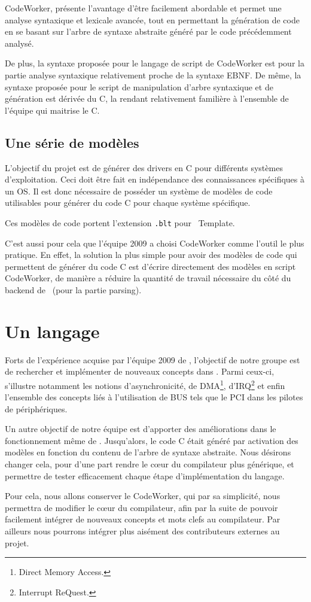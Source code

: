 \documentclass{rtxreport}
\begin{document}
CodeWorker, présente l'avantage d'être facilement abordable et permet une
analyse syntaxique et lexicale avancée, tout en permettant la génération de
code en se basant sur l'arbre de syntaxe abstraite généré par le code
précédemment analysé.

De plus, la syntaxe proposée pour le langage de script de CodeWorker est pour
la partie analyse syntaxique relativement proche de la syntaxe EBNF. De même,
la syntaxe proposée pour le script de manipulation d'arbre syntaxique et de
génération est dérivée du C, la rendant relativement familière à l'ensemble de
l'équipe qui maitrise le C.

\subsection{Une série de modèles}

L'objectif du projet est de générer des drivers en C pour différents systèmes
d'exploitation. Ceci doit être fait en indépendance des connaissances
spécifiques à un OS. Il est donc nécessaire de posséder un système de modèles
de code utilisables pour générer du code C pour chaque système spécifique.

Ces modèles de code portent l'extension \texttt{.blt} pour \BL\ Template.

C'est aussi pour cela que l'équipe 2009 a choisi CodeWorker comme l'outil le plus
pratique. En effet, la solution la plus simple pour avoir des modèles de code
qui permettent de générer du code C est d'écrire directement des modèles
en script CodeWorker, de manière a réduire la quantité de travail nécessaire
du côté du backend de \rtx\ (pour la partie parsing).

\section{Un langage}

Forts de l'expérience acquise par l'équipe 2009 de \rtx, l'objectif de
notre groupe est de rechercher et implémenter de nouveaux concepts dans
\rtx. Parmi ceux-ci, s'illustre notamment les notions d'asynchronicité,
de DMA\footnote{Direct Memory Access.}, d'IRQ\footnote{Interrupt ReQuest.} et
enfin l'ensemble des concepts liés à l'utilisation de BUS tels que le PCI dans
les pilotes de périphériques.

Un autre objectif de notre équipe est d'apporter des améliorations dans le
fonctionnement même de \rtx. Jusqu'alors, le code C était généré par
activation des modèles en fonction du contenu de l'arbre de syntaxe abstraite.
Nous désirons changer cela, pour d'une part rendre le cœur du compilateur
plus générique, et permettre de tester efficacement chaque étape
d'implémentation du langage.

Pour cela, nous allons conserver le CodeWorker, qui par sa simplicité, nous
permettra de modifier le cœur du compilateur, afin par la suite de pouvoir
facilement intégrer de nouveaux concepts et mots clefs au compilateur. Par
ailleurs nous pourrons intégrer plus aisément des contributeurs externes au
projet.

\newpage

\rtxbibliography
\end{document}

